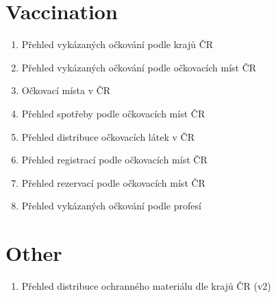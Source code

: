 \section{Vaccination}

\begin{enumerate}
    \item Přehled vykázaných očkování podle krajů ČR
    \item Přehled vykázaných očkování podle očkovacích míst ČR
    \item Očkovací místa v ČR
    \item Přehled spotřeby podle očkovacích míst ČR
    \item Přehled distribuce očkovacích látek v ČR
    \item Přehled registrací podle očkovacích míst ČR
    \item Přehled rezervací podle očkovacích míst ČR
    \item Přehled vykázaných očkování podle profesí
\end{enumerate}

\section{Other}

\begin{enumerate}
    \item Přehled distribuce ochranného materiálu dle krajů ČR (v2)
\end{enumerate}
